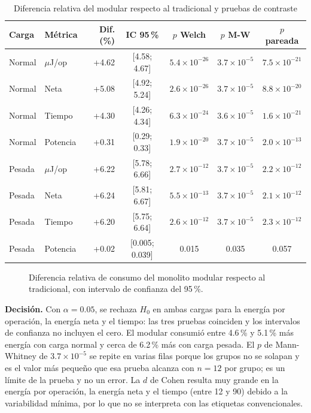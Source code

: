 \begin{table}[htbp]
\centering
\caption{Diferencia relativa del modular respecto al tradicional y pruebas de contraste}
\label{tab:contraste}
\small
{}
\setlength{\parskip}{0pt}
\begin{tabular}{@{}llrcccc@{}}
\toprule
\textbf{Carga} & \textbf{Métrica} & \textbf{Dif. (\%)} & \textbf{IC 95\,\%} & \textbf{$p$ Welch} & \textbf{$p$ M-W} & \textbf{$p$ pareada} \\
\midrule
Normal & $\mu$J/op & +4.62 & [4.58; 4.67] & $5.4\times10^{-26}$ & $3.7\times10^{-5}$ & $7.5\times10^{-21}$ \\
Normal & Neta & +5.08 & [4.92; 5.24] & $2.6\times10^{-26}$ & $3.7\times10^{-5}$ & $8.8\times10^{-20}$ \\
Normal & Tiempo & +4.30 & [4.26; 4.34] & $6.3\times10^{-24}$ & $3.6\times10^{-5}$ & $1.6\times10^{-21}$ \\
Normal & Potencia & +0.31 & [0.29; 0.33] & $1.9\times10^{-20}$ & $3.7\times10^{-5}$ & $2.0\times10^{-13}$ \\
\addlinespace
Pesada & $\mu$J/op & +6.22 & [5.78; 6.66] & $2.7\times10^{-12}$ & $3.7\times10^{-5}$ & $2.2\times10^{-12}$ \\
Pesada & Neta & +6.24 & [5.81; 6.67] & $5.5\times10^{-13}$ & $3.7\times10^{-5}$ & $2.1\times10^{-12}$ \\
Pesada & Tiempo & +6.20 & [5.75; 6.64] & $2.6\times10^{-12}$ & $3.7\times10^{-5}$ & $2.3\times10^{-12}$ \\
Pesada & Potencia & +0.02 & [0.005; 0.039] & 0.015 & 0.035 & 0.057 \\
\bottomrule
\end{tabular}
\end{table}

\begin{figure}[H]
\centering
{}
\caption{Diferencia relativa de consumo del monolito modular respecto al tradicional, con intervalo de confianza del 95\,\%.}
\label{fig:diferencia}
\end{figure}

\textbf{Decisión.} Con $\alpha = 0.05$, se rechaza $H_0$ en ambas cargas para la energía por operación, la energía neta y el tiempo: las tres pruebas coinciden y los intervalos de confianza no incluyen el cero. El modular consumió entre 4.6\,\% y 5.1\,\% más energía con carga normal y cerca de 6.2\,\% más con carga pesada. El $p$ de Mann-Whitney de $3.7\times10^{-5}$ se repite en varias filas porque los grupos no se solapan y es el valor más pequeño que esa prueba alcanza con $n = 12$ por grupo; es un límite de la prueba y no un error. La $d$ de Cohen resulta muy grande en la energía por operación, la energía neta y el tiempo (entre 12 y 90) debido a la variabilidad mínima, por lo que no se interpreta con las etiquetas convencionales.

